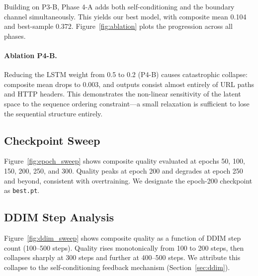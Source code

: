 \documentclass[11pt,a4paper]{article}
\begin{document}
Building on P3-B, Phase 4-A adds both self-conditioning and the boundary channel
simultaneously. This yields our best model, with composite mean 0.104 and best-sample
0.372. Figure~\ref{fig:ablation} plots the progression across all phases.

\paragraph{Ablation P4-B.}
Reducing the LSTM weight from 0.5 to 0.2 (P4-B) causes catastrophic collapse:
composite mean drops to 0.003, and outputs consist almost entirely of URL paths and
HTTP headers. This demonstrates the non-linear sensitivity of the latent space to
the sequence ordering constraint---a small relaxation is sufficient to lose the
sequential structure entirely.

\subsection{Checkpoint Sweep}
\label{sec:ckpt}

Figure~\ref{fig:epoch_sweep} shows composite quality evaluated at epochs 50, 100,
150, 200, 250, and 300. Quality peaks at epoch 200 and degrades at epoch 250 and beyond,
consistent with overtraining. We designate the epoch-200 checkpoint as \texttt{best.pt}.

\subsection{DDIM Step Analysis}
\label{sec:ddim_sweep}

Figure~\ref{fig:ddim_sweep} shows composite quality as a function of DDIM step count
(100--500 steps). Quality rises monotonically from 100 to 200 steps, then collapses
sharply at 300 steps and further at 400--500 steps. We attribute this collapse to the
self-conditioning feedback mechanism (Section~\ref{sec:ddim}).
\end{document}
